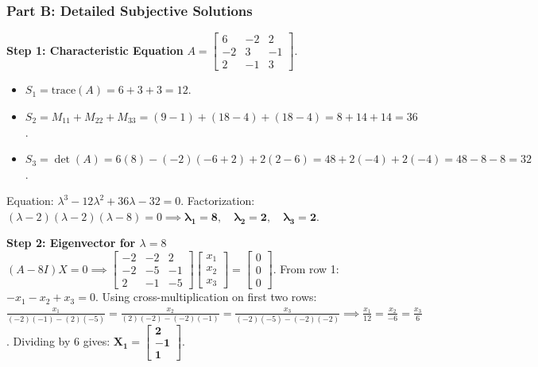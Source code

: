 \subsubsection*{Part B: Detailed Subjective Solutions}

\begin{solutionbox}
\textbf{Step 1: Characteristic Equation}
$A = \begin{bmatrix} 6 & -2 & 2 \\ -2 & 3 & -1 \\ 2 & -1 & 3 \end{bmatrix}$.
\begin{itemize}[leftmargin=6mm]
    \item $S_1 = \text{trace}(A) = 6 + 3 + 3 = 12$.
    \item $S_2 = M_{11} + M_{22} + M_{33} = (9 - 1) + (18 - 4) + (18 - 4) = 8 + 14 + 14 = 36$.
    \item $S_3 = \det(A) = 6(8) - (-2)(-6 + 2) + 2(2 - 6) = 48 + 2(-4) + 2(-4) = 48 - 8 - 8 = 32$.
\end{itemize}
Equation: $\lambda^3 - 12\lambda^2 + 36\lambda - 32 = 0$.
Factorization: $(\lambda - 2)(\lambda - 2)(\lambda - 8) = 0 \implies \mathbf{\lambda_1 = 8, \quad \lambda_2 = 2, \quad \lambda_3 = 2}$.

\textbf{Step 2: Eigenvector for $\lambda = 8$}
$(A - 8I)X = 0 \implies \begin{bmatrix} -2 & -2 & 2 \\ -2 & -5 & -1 \\ 2 & -1 & -5 \end{bmatrix} \begin{bmatrix} x_1 \\ x_2 \\ x_3 \end{bmatrix} = \begin{bmatrix} 0 \\ 0 \\ 0 \end{bmatrix}$.
From row 1: $-x_1 - x_2 + x_3 = 0$.
Using cross-multiplication on first two rows:
$\frac{x_1}{(-2)(-1) - (2)(-5)} = \frac{x_2}{(2)(-2) - (-2)(-1)} = \frac{x_3}{(-2)(-5) - (-2)(-2)} \implies \frac{x_1}{12} = \frac{x_2}{-6} = \frac{x_3}{6}$.
Dividing by 6 gives: $\mathbf{X_1 = \begin{bmatrix} 2 \\ -1 \\ 1 \end{bmatrix}}$.


\end{solutionbox}
